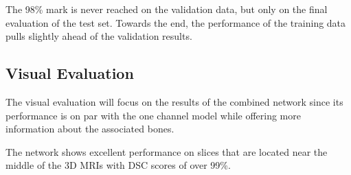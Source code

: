 The 98\% mark is never reached on the validation data, but only on the final evaluation of the test set. Towards the end, the performance of the training data pulls slightly ahead of the validation results.

\subsection{Visual Evaluation}

The visual evaluation will focus on the results of the combined network since its performance is on par with the one channel model while offering more information about the associated bones.

The network shows excellent performance on slices that are located near the middle of the 3D MRIs with DSC scores of over 99\%.

